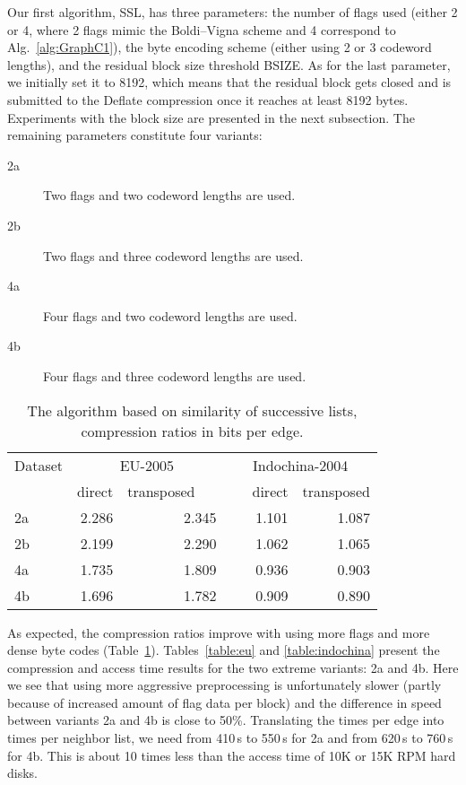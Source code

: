\documentclass[envcountsame]{llncs}
\begin{document}
Our first algorithm, SSL, has three parameters: the number of flags used (either 2 or 4, 
where 2 flags mimic the Boldi--Vigna scheme and 4 correspond to Alg.~\ref{alg:GraphC1}),
the byte encoding scheme (either using 2 or 3 codeword lengths), and the residual
block size threshold BSIZE. As for the last parameter, we initially set it to 8192, 
which means that the residual block gets closed and is submitted to the Deflate 
compression once it reaches at least 8192 bytes. Experiments with the block size 
are presented in the next subsection. 
The remaining parameters constitute four variants:
\begin{description}
  \item[2a] Two flags and two codeword lengths are used.
  \item[2b] Two flags and three codeword lengths are used.
  \item[4a] Four flags and two codeword lengths are used.
  \item[4b] Four flags and three codeword lengths are used.
\end{description}


\begin{table}
\centering
\begin{tabular}{lrrrr}
\hline
Dataset & \multicolumn{2}{c}{EU-2005} &  \multicolumn{2}{c}{Indochina-2004}  \\
\cline{2-5}
        &  direct & transposed~~~&~~~direct & transposed  \\
\hline
2a & 2.286 & 2.345 & 1.101 & 1.087 \\
2b & 2.199 & 2.290 & 1.062 & 1.065 \\
4a & 1.735 & 1.809 & 0.936 & 0.903 \\
4b & 1.696 & 1.782 & 0.909 & 0.890 \\
\hline
\end{tabular}
\vspace{4mm}
\caption{The algorithm based on similarity of successive lists, compression ratios in bits per edge.}
\label{table:ratios}
\end{table}


As expected, the compression ratios improve with using more flags and more dense 
byte codes (Table~\ref{table:ratios}).
Tables~\ref{table:eu} and \ref{table:indochina} present the compression 
and access time results for the two extreme variants: 2a and 4b.
Here we see that using more aggressive preprocessing is unfortunately slower 
(partly because of increased amount of flag data per block)
and the difference in speed between variants 2a and 4b is close to 50\%. 
Translating the times per edge into times per neighbor list, we need from 
410\,s to 550\,s for 2a and from 620\,s to 760\,s for 4b. 
This is about 10 times less than the access time of 10K or 15K RPM hard disks.
\end{document}
